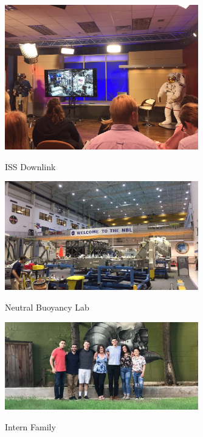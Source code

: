 \documentclass{article}
\begin{document}
\begin{figure}[!htb]
  \centering
  \caption{ISS Downlink}
  \includegraphics[width=0.75\textwidth]{assets/videodemonstration.png}
  \label{fig:videodemonstration}
\end{figure}

\begin{figure}[!htb]
  \centering
  \caption{Neutral Buoyancy Lab}
  \includegraphics[width=0.75\textwidth]{assets/welcometonbl.png}
  \label{fig:welcometonbl}
\end{figure}

\begin{figure}[!htb]
  \centering
  \caption{Intern Family}
  \includegraphics[width=0.75\textwidth]{assets/ronniewithfriends.png}
  \label{fig:ronniewithfriends}
\end{figure}
\end{document}
